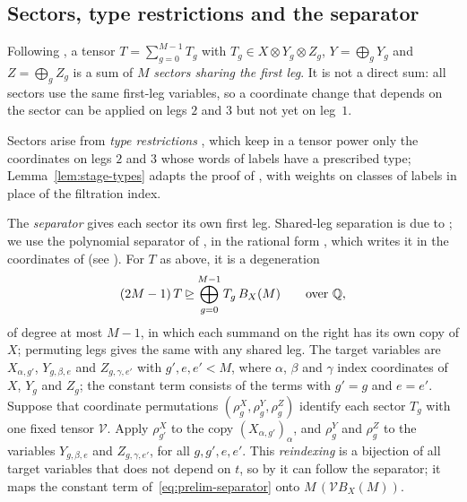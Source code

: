 \subsection{Sectors, type restrictions and the separator}
\label{subsec:prelim-sectors}

Following \citep[Section~4]{FinCon26}, a tensor
\(T=\sum_{g=0}^{M-1}T_g\) with \(T_g\in X\otimes Y_g\otimes Z_g\),
\(Y=\bigoplus_gY_g\) and \(Z=\bigoplus_gZ_g\) is a sum of \(M\)
\emph{sectors sharing the first leg}. It is not a direct sum: all sectors
use the same first-leg variables, so a coordinate change that depends on
the sector can be applied on legs \(2\) and \(3\) but not yet on leg~\(1\).

Sectors arise from \emph{type restrictions} \citep[Section~4.1 and
Lemma~4.3]{FinCon26}, which keep in a tensor power only the coordinates
on legs \(2\) and \(3\) whose words of labels have a prescribed type;
Lemma~\ref{lem:stage-types} adapts the proof of
\citep[Lemma~4.3]{FinCon26}, with weights on classes of labels in place
of the filtration index.

The \emph{separator} gives each sector its own first leg. Shared-leg
separation is due to \citet[Proposition~3.1]{OAI26}; we use the
polynomial separator of \citet[Proposition~2.1]{Lu26}, in the rational
form \citep[Lemma~9.1(b)]{FinCon26}, which writes it in the coordinates
of \citep[Proposition~4.6]{FinCon26} (see \citep[Remark~4.7]{FinCon26}).
For \(T\) as above, it is a degeneration
\begin{equation}\label{eq:prelim-separator}
 (2M-1)\,T\unrhd\bigoplus_{g=0}^{M-1}T_g\,B_X(M)\qquad\text{over }\mathbb Q,
\end{equation}
of degree at most \(M-1\), in which each summand on the right has its own
copy of \(X\); permuting legs gives the same with any shared leg. The
target variables are \(X_{\alpha,g'}\), \(Y_{g,\beta,e}\) and
\(Z_{g,\gamma,e'}\) with \(g',e,e'<M\), where \(\alpha\), \(\beta\)
and \(\gamma\) index coordinates of \(X\), \(Y_g\) and \(Z_g\); the
constant term consists of the terms with \(g'=g\) and \(e=e'\). Suppose
that coordinate permutations \((\rho^X_g,\rho^Y_g,\rho^Z_g)\) identify
each sector \(T_g\) with one fixed tensor \(\mathcal V\). Apply \(\rho^X_{g'}\) to
the copy \((X_{\alpha,g'})_\alpha\), and \(\rho^Y_g\) and \(\rho^Z_g\) to
the variables \(Y_{g,\beta,e}\) and \(Z_{g,\gamma,e'}\), for all
\(g,g',e,e'\). This \emph{reindexing} \citep[(B.6)]{FinCon26} is a
bijection of all target variables that does not depend on \(t\), so by
\citep[Lemma~2.1]{FinCon26} it can follow the separator; it maps the
constant term of~\eqref{eq:prelim-separator} onto
\(M\,(\mathcal V B_X(M))\).

